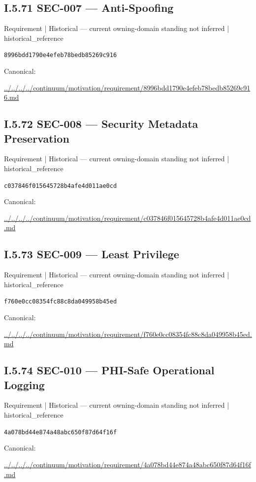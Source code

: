 \documentclass[10pt,a4paper]{article}
\begin{document}
\subsection*{I.5.71 SEC-007 — Anti-Spoofing}
{\small Requirement | Historical — current owning-domain standing not inferred | historical\_reference}\par
\texttt{8996bdd1790e4efeb78bedb85269c916}\par
Canonical: \par
{\footnotesize\url{../../../../continuum/motivation/requirement/8996bdd1790e4efeb78bedb85269c916.md}}\par
\subsection*{I.5.72 SEC-008 — Security Metadata Preservation}
{\small Requirement | Historical — current owning-domain standing not inferred | historical\_reference}\par
\texttt{c037846f015645728b4afe4d011ae0cd}\par
Canonical: \par
{\footnotesize\url{../../../../continuum/motivation/requirement/c037846f015645728b4afe4d011ae0cd.md}}\par
\subsection*{I.5.73 SEC-009 — Least Privilege}
{\small Requirement | Historical — current owning-domain standing not inferred | historical\_reference}\par
\texttt{f760e0cc08354fc88c8da049958b45ed}\par
Canonical: \par
{\footnotesize\url{../../../../continuum/motivation/requirement/f760e0cc08354fc88c8da049958b45ed.md}}\par
\subsection*{I.5.74 SEC-010 — PHI-Safe Operational Logging}
{\small Requirement | Historical — current owning-domain standing not inferred | historical\_reference}\par
\texttt{4a078bd44e874a48abc650f87d64f16f}\par
Canonical: \par
{\footnotesize\url{../../../../continuum/motivation/requirement/4a078bd44e874a48abc650f87d64f16f.md}}\par
\end{document}
